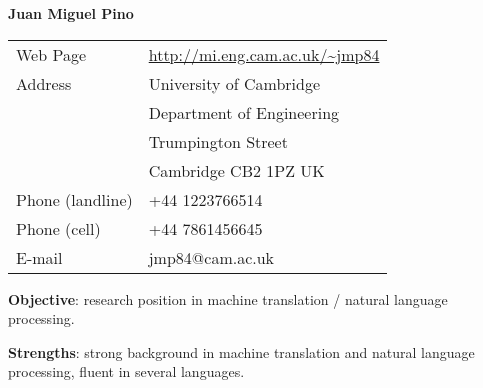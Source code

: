 \documentclass[letterpaper,11pt]{article}
\begin{document}
\begin{center}
  {\LARGE \bf Juan Miguel Pino}
\end{center}

\begin{tabular}{ll}
Web Page & \url{http://mi.eng.cam.ac.uk/~jmp84} \\
Address & University of Cambridge \\
        & Department of Engineering \\
        & Trumpington Street \\
        & Cambridge CB2 1PZ UK \\
Phone (landline) & +44 1223766514 \\
Phone (cell) & +44 7861456645 \\
E-mail & jmp84@cam.ac.uk \\
\end{tabular}


\begin{itemize*}
  \item {\bf Objective}: research position in machine translation / natural language processing.
  \item {\bf Strengths}: strong background in machine translation and natural language processing, fluent in several languages.
\end{itemize*}
\end{document}
